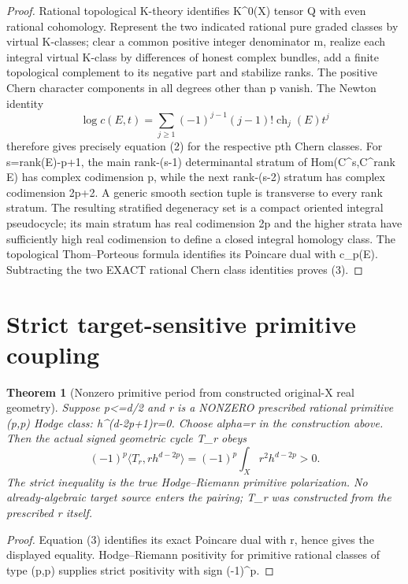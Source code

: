 \documentclass[11pt]{article}
\newtheorem{theorem}{Theorem}
\begin{document}
\begin{proof}
Rational topological K-theory identifies
K^0(X) tensor Q with even rational cohomology.
Represent the two indicated rational pure graded
classes by virtual K-classes; clear a common
positive integer denominator m, realize each
integral virtual K-class by differences of honest
complex bundles, add a finite topological
complement to its negative part and stabilize ranks.
The positive Chern character components in all
degrees other than p vanish. The Newton
identity
\[
 \log c(E,t)=\sum_{j\ge1}(-1)^{j-1}
                 (j-1)!\operatorname{ch}_j(E)t^j
\]
therefore gives precisely equation (2)
for the respective pth Chern classes.
For s=rank(E)-p+1, the main rank-(s-1)
determinantal stratum of Hom(C^s,C^rank E)
has complex codimension p, while the
next rank-(s-2) stratum has complex
codimension 2p+2.
A generic smooth section tuple is transverse
to every rank stratum. The resulting
stratified degeneracy set is a compact
oriented integral pseudocycle; its main
stratum has real codimension 2p and the
higher strata have sufficiently high real
codimension to define a closed integral
homology class. The topological
Thom--Porteous formula identifies its
Poincare dual with c_p(E). Subtracting
the two EXACT rational Chern class
identities proves (3).
\end{proof}

\section{Strict target-sensitive primitive coupling}
\begin{theorem}[Nonzero primitive period from constructed original-X real geometry]
Suppose p<=d/2 and r is a NONZERO prescribed
rational primitive (p,p) Hodge class:
h^(d-2p+1)r=0.
Choose alpha=r in the construction above.
Then the actual signed geometric cycle T_r obeys
\[
 \boxed{
 (-1)^p \langle T_r,r h^{d-2p}\rangle
   =(-1)^p\int_X r^2 h^{d-2p}>0.
 }                                                       \tag{4}
\]
The strict inequality is the true
Hodge--Riemann primitive polarization.
No already-algebraic target source
enters the pairing; T_r was constructed
from the prescribed r itself.
\end{theorem}
\begin{proof}
Equation (3) identifies its exact
Poincare dual with r, hence gives the
displayed equality. Hodge--Riemann
positivity for primitive rational
classes of type (p,p) supplies strict
positivity with sign (-1)^p.
\end{proof}
\end{document}

